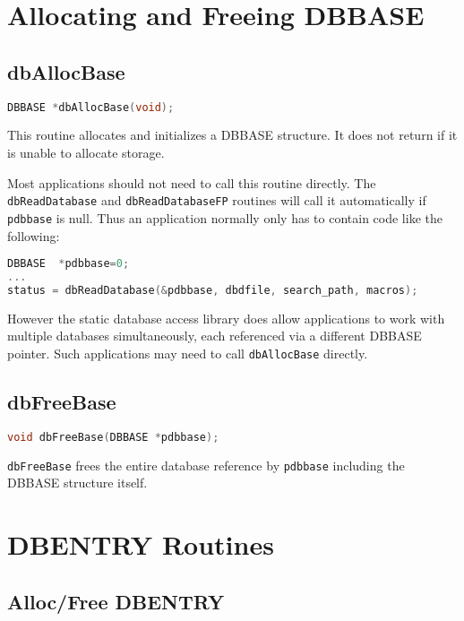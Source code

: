 \section{Allocating and Freeing DBBASE}

\subsection{dbAllocBase}

\begin{lstlisting}[language=C]
DBBASE *dbAllocBase(void);
\end{lstlisting}

This routine allocates and initializes a DBBASE structure.
It does not return if it is unable to allocate storage.

Most applications should not need to call this routine directly.
The \verb|dbReadDatabase| and \verb|dbReadDatabaseFP| routines will call it automatically if \verb|pdbbase| is null.
Thus an application normally only has to contain code like the following:

\begin{lstlisting}[language=C]
DBBASE  *pdbbase=0;
...
status = dbReadDatabase(&pdbbase, dbdfile, search_path, macros);
\end{lstlisting}

However the static database access library does allow applications to work with multiple databases simultaneously, each referenced via a different DBBASE pointer.
Such applications may need to call \verb|dbAllocBase| directly.

\subsection{dbFreeBase}

\begin{lstlisting}[language=C]
void dbFreeBase(DBBASE *pdbbase);
\end{lstlisting}

\verb|dbFreeBase| frees the entire database reference by \verb|pdbbase| including the DBBASE structure itself.

\section{DBENTRY Routines}

\subsection{Alloc/Free DBENTRY}

